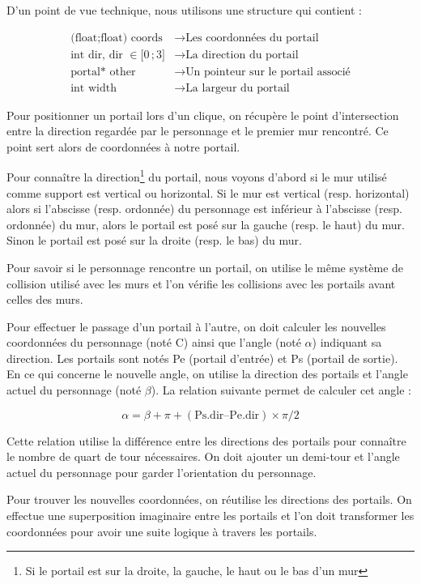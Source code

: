 \documentclass[11pt]{article}
\begin{document}
D’un point de vue technique, nous utilisons une structure qui contient :

\begin{align*}
    \text{(float;float) coords} & \xrightarrow{} \text{Les coordonnées du portail} \\
    \text{int dir, dir } \in \mathopen{[}0\,;3\mathclose{]} & \xrightarrow{} \text{La direction du portail} \\
    \text{portal* other} & \xrightarrow{} \text{Un pointeur sur le portail associé} \\
    \text{int width} & \xrightarrow{} \text{La largeur du portail}
\end{align*}

Pour positionner un portail lors d’un clique, on récupère le point d’inter\-section entre la direction regardée par le personnage et le premier mur rencontré. 
Ce point sert alors de coordonnées à notre portail. 

Pour connaître la direction\footnote{Si le portail est sur la droite, la gauche, le haut ou le bas d’un mur} du portail, nous voyons d’abord si le mur utilisé comme support est vertical ou horizontal. 
Si le mur est vertical (resp. horizontal) alors si l’abscisse (resp. ordonnée) du personnage est inférieur à l’abscisse (resp. ordonnée) du mur, alors le portail est posé sur la gauche (resp. le haut) du mur. Sinon  le portail est posé sur la droite (resp. le bas) du mur.

Pour savoir si le personnage rencontre un portail, on utilise le même système de collision utilisé avec les murs et l’on vérifie les collisions avec les portails avant celles des murs.

Pour effectuer le passage d’un portail à l’autre, on doit calculer les nouvelles coordonnées du personnage (noté C) ainsi que l’angle (noté $\alpha$) indiquant sa direction. Les portails sont notés Pe (portail d’entrée) et Ps (portail de sortie).
En ce qui concerne le nouvelle angle, on utilise la direction des portails et l’angle actuel du personnage (noté $\beta$). La relation suivante permet de calculer cet angle :

$$\alpha = \beta + \pi + (\text{Ps.dir} – \text{Pe.dir}) \times \pi / 2$$

Cette relation utilise la différence entre les directions des portails pour connaître le nombre de quart de tour nécessaires. On doit ajouter un demi-tour et l’angle actuel du personnage pour garder l’orientation du personnage.

Pour trouver les nouvelles coordonnées, on réutilise les directions des portails. On effectue une superposition imaginaire entre les portails et l’on doit transformer les coordonnées pour avoir une suite logique à travers les portails.
\end{document}
